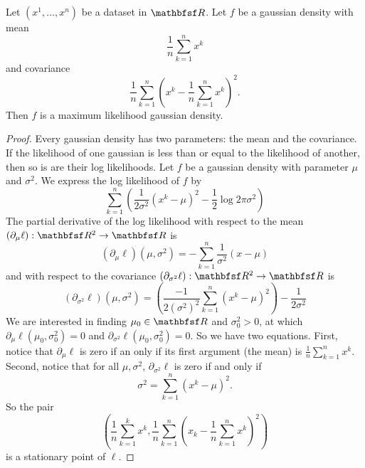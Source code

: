 \begin{prop}
Let $(x^1, \dots, x^n)$ be a dataset in $\R$.
Let $f$ be a gaussian density with mean
$$\frac{1}{n} \sum_{k = 1}^{n} x^k$$
and covariance
$$\frac{1}{n} \sum_{k = 1}^{n} \left(x^k - \frac{1}{n} \sum_{k = 1}^{n} x^k\right)^2.$$
Then $f$ is a maximum likelihood gaussian density.
\begin{proof}
  Every gaussian density has two parameters: the mean
  and the covariance.
  If the likelihood of one gaussian is less than or equal
  to the likelihood of another, then so is are their
  log likelihoods.
  Let $f$ be a gaussian density with parameter $\mu$ and $\sigma^2$.
  We express the log likelihood of
  $f$ by
  \[
    \sum_{k = 1}^{n} \left( \frac{1}{2\sigma^2}(x^k - \mu)^2 - \frac{1}{2}\log2\pi\sigma^2\right)
  \]
  The partial derivative of the log likelihood with
  respect to the mean $(\partial_{\mu} \ell): \R^2 \to \R$ is
  \[
    (\partial_\mu \ell)(\mu, \sigma^2) = - \sum_{k = 1}^{n} \frac{1}{\sigma^2}(x - \mu)
  \]
  and with respect to the covariance $(\partial_{\sigma^2} \ell): \R^2 \to \R$ is
  \[
    (\partial_{\sigma^2} \ell)(\mu, \sigma^2) =
    \left(\frac{-1}{2(\sigma^2)^{2}}\sum_{k = 1}^{n}(x^k - \mu)^2\right)- \frac{1}{2\sigma^2}
  \]
  We are interested in finding $\mu_0 \in \R$ and $\sigma^2_0 > 0$, at which
  $\partial_\mu \ell(\mu_0, \sigma^2_0) = 0$ and
  $\partial_{\sigma^2} \ell(\mu_0, \sigma^2_0) = 0$.
  So we have two equations.
  First, notice that
  $\partial_\mu \ell$ is zero if an only if
  its first argument (the mean) is $\frac{1}{n} \sum_{k = 1}^{n} x^k$.
  Second, notice that for all $\mu, \sigma^2$,
  $\partial_{\sigma^2}\ell$ is zero if and only if
  \[
    \sigma^2 = \sum_{k = 1}^{n} (x^k - \mu)^2.
  \]
  So the pair
  \[
    \left(\frac{1}{n}\sum_{k = 1}^{k} x^k, \frac{1}{n} \sum_{k = 1}^{n} (x_k - \frac{1}{n} \sum_{k = 1}^{n}  x^k)^2\right)
  \]
  is a stationary point of $\ell$.
\end{proof}
\end{prop}
\strats
